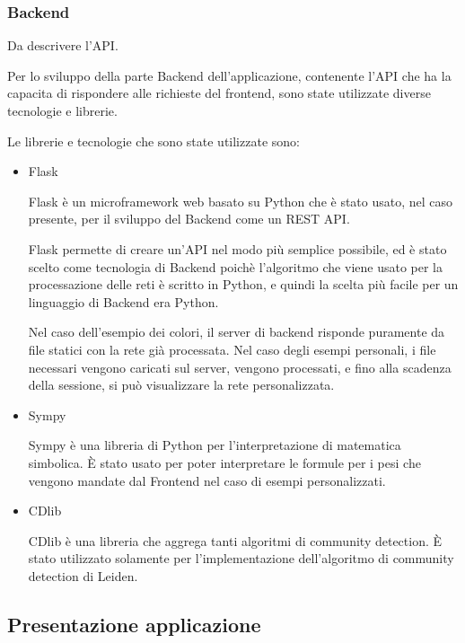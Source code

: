 \documentclass[a4paper,12pt]{report}
\begin{document}
			\subsubsection{Backend}
			
			Da descrivere l'API.

			Per lo sviluppo della parte Backend dell'applicazione, contenente l'API che ha la capacita di rispondere alle richieste del frontend, sono state utilizzate diverse tecnologie e librerie. \par
			Le librerie e tecnologie che sono state utilizzate sono:
			\begin{itemize}
				\item Flask \par
				Flask è un microframework web basato su Python che è stato usato, nel caso presente, per il sviluppo del Backend come un REST API. \cite{flaskforeword} \par
				Flask permette di creare un’API nel modo più semplice possibile, ed è stato scelto come tecnologia di Backend poichè l’algoritmo che viene usato per la processazione delle reti è scritto in Python, e quindi la scelta più facile per un linguaggio di Backend era Python. \par
				Nel caso dell’esempio dei colori, il server di backend risponde puramente da file statici con la rete già processata. Nel caso degli esempi personali, i file necessari vengono caricati sul server, vengono processati, e fino alla scadenza della sessione, si può visualizzare la rete personalizzata.
				
				\item Sympy \par
				Sympy è una libreria di Python per l’interpretazione di matematica simbolica. È stato usato per poter interpretare le formule per i pesi che vengono mandate dal Frontend nel caso di esempi personalizzati. \cite{sympy}
			
				\item CDlib \par
				CDlib è una libreria che aggrega tanti algoritmi di community detection. È stato utilizzato solamente per l’implementazione dell’algoritmo di community detection di Leiden. \cite{cdlib}
			\end{itemize}
		\subsection{Presentazione applicazione}
			
\end{document}
